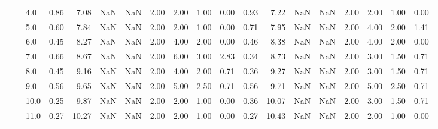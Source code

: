 \begin{tabular}{lllrrrrrrrrrrrrrrrr}
       &     & 4.0  &      0.86 &       7.08 &               NaN &                NaN & 2.00 &   2.00 &             1.00 &                         0.00 &      0.93 &       7.22 &               NaN &                NaN & 2.00 &   2.00 &             1.00 &                         0.00 \\
       &     & 5.0  &      0.60 &       7.84 &               NaN &                NaN & 2.00 &   2.00 &             1.00 &                         0.00 &      0.71 &       7.95 &               NaN &                NaN & 2.00 &   4.00 &             2.00 &                         1.41 \\
       &     & 6.0  &      0.45 &       8.27 &               NaN &                NaN & 2.00 &   4.00 &             2.00 &                         0.00 &      0.46 &       8.38 &               NaN &                NaN & 2.00 &   4.00 &             2.00 &                         0.00 \\
       &     & 7.0  &      0.66 &       8.67 &               NaN &                NaN & 2.00 &   6.00 &             3.00 &                         2.83 &      0.34 &       8.73 &               NaN &                NaN & 2.00 &   3.00 &             1.50 &                         0.71 \\
       &     & 8.0  &      0.45 &       9.16 &               NaN &                NaN & 2.00 &   4.00 &             2.00 &                         0.71 &      0.36 &       9.27 &               NaN &                NaN & 2.00 &   3.00 &             1.50 &                         0.71 \\
       &     & 9.0  &      0.56 &       9.65 &               NaN &                NaN & 2.00 &   5.00 &             2.50 &                         0.71 &      0.56 &       9.71 &               NaN &                NaN & 2.00 &   5.00 &             2.50 &                         0.71 \\
       &     & 10.0 &      0.25 &       9.87 &               NaN &                NaN & 2.00 &   2.00 &             1.00 &                         0.00 &      0.36 &      10.07 &               NaN &                NaN & 2.00 &   3.00 &             1.50 &                         0.71 \\
       &     & 11.0 &      0.27 &      10.27 &               NaN &                NaN & 2.00 &   2.00 &             1.00 &                         0.00 &      0.27 &      10.43 &               NaN &                NaN & 2.00 &   2.00 &             1.00 &                         0.00 \\

\end{tabular}
